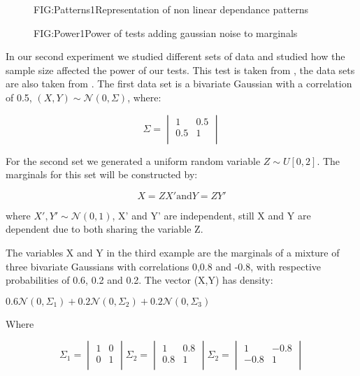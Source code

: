 \begin{figure}[Non linear dependance patterns example 1]{FIG:Patterns1}{Representation of non linear dependance patterns}
\end{figure}

\begin{figure}[Power of tests uniform marginals same size adding noise]{FIG:Power1}{Power of tests adding gaussian noise to marginals}
\end{figure}

In our second experiment we studied different sets of data and studied how the sample size affected the power of our tests. This test is taken from \cite{Size}, the data sets are also taken from \cite{Size}.
The first data set is a bivariate Gaussian with a correlation of 0.5, $(X,Y)\sim \mathcal{N}(0,\Sigma)$, where:

$$\Sigma =
\begin{vmatrix}
1&0.5\\
0.5&1\\
\end{vmatrix}
$$

For the second set we generated a uniform random variable $Z\sim U[0,2]$. The marginals for this set will be constructed by:

$$X=ZX' \text{and} Y = ZY'$$

where $X',Y' \sim \mathcal{N}(0,1)$, X' and Y' are independent, still X and Y are dependent due to both sharing the variable Z.

The variables X and Y in the third example are the marginals of a mixture of three bivariate Gaussians with correlations 0,0.8 and -0.8, with respective probabilities of 0.6, 0.2 and 0.2. 
The vector (X,Y) has density:

$0.6\mathcal{N}(0,\Sigma_{1}) + 0.2\mathcal{N}(0,\Sigma_{2}) + 0.2\mathcal{N}(0,\Sigma_{3})$

Where 

$$\Sigma_{1} =\begin{vmatrix}1&0\\0&1\\ \end{vmatrix} \Sigma_{2} =\begin{vmatrix}1&0.8\\0.8&1\\ \end{vmatrix} \Sigma_{2} =\begin{vmatrix}1&-0.8\\-0.8&1\\ \end{vmatrix}$$

